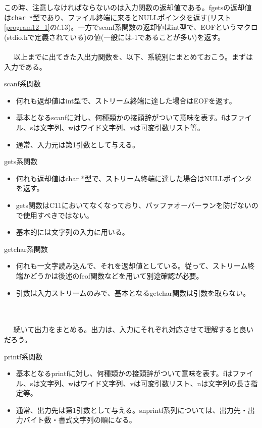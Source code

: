 この時、注意しなければならないのは入力関数の返却値である。fgetsの返却値は\verb|char *|型であり、ファイル終端に来るとNULLポインタを返す(リスト\ref{program12_1}の$l$.13)。一方でscanf系関数の返却値はint型で、EOFというマクロ(stdio.hで定義されている)の値(一般には-1であることが多い)を返す。
\\ \\　
以上までに出てきた入出力関数を、以下、系統別にまとめておこう。まずは入力である。
\begin{itembox}[l]{scanf系関数}
\begin{itemize}
\item 何れも返却値はint型で、ストリーム終端に達した場合はEOFを返す。
\item 基本となるscanfに対し、何種類かの接頭辞がついて意味を表す。fはファイル、sは文字列、wはワイド文字列、vは可変引数リスト等。
\item 通常、入力元は第1引数として与える。
\end{itemize}
\end{itembox}

\begin{itembox}[l]{gets系関数}
\begin{itemize}
\item 何れも返却値はchar *型で、ストリーム終端に達した場合はNULLポインタを返す。
\item gets関数はC11においてなくなっており、バッファオーバーランを防げないので使用すべきではない。
\item 基本的には文字列の入力に用いる。
\end{itemize}
\end{itembox}

\begin{itembox}[l]{getchar系関数}
\begin{itemize}
\item 何れも一文字読み込んで、それを返却値としている。従って、ストリーム終端かどうかは後述のfeof関数などを用いて別途確認が必要。
\item 引数は入力ストリームのみで、基本となるgetchar関数は引数を取らない。
\end{itemize}
\end{itembox}
\\ \\　
続いて出力をまとめる。出力は、入力にそれぞれ対応させて理解すると良いだろう。
\begin{itembox}[l]{printf系関数}
\begin{itemize}
\item 基本となるprintfに対し、何種類かの接頭辞がついて意味を表す。fはファイル、sは文字列、wはワイド文字列、vは可変引数リスト、nは文字列の長さ指定等。
\item 通常、出力先は第1引数として与える。snprintf系列については、出力先・出力バイト数・書式文字列の順になる。
\end{itemize}
\end{itembox}

